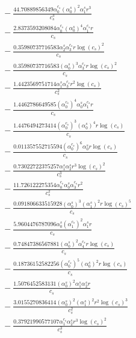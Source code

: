 \documentclass[10pt]{article}
\begin{document}
\begin{align*}
&{}  - \frac{44.70889856349 \alpha_{0}^{c_s} \left(\alpha_{0}^s\right)^{2} \alpha_{1}^s r^{3}}{c_{s}^{3}} \\
&{}  - \frac{2.8373593208084 \alpha_{0}^{c_s} \left(\alpha_{0}^s\right)^{4} \alpha_{1}^{c_s} r}{c_{s}} \\
&{}  - \frac{0.35980737716583 \alpha_{2}^s \alpha_{3}^{c_s} r \log{\left(c_{s} \right)}^{2}}{c_{s}} \\
&{}  - \frac{0.35980737716583 \left(\alpha_{0}^s\right)^{3} \alpha_{3}^{c_s} r \log{\left(c_{s} \right)}^{2}}{c_{s}} \\
&{}  - \frac{1.4423569751714 \alpha_{1}^s \alpha_{3}^{c_s} r^{2} \log{\left(c_{s} \right)}}{c_{s}^{2}} \\
&{}  - \frac{1.4462786649585 \left(\alpha_{0}^{c_s}\right)^{4} \alpha_{0}^s \alpha_{1}^{c_s} r}{c_{s}} \\
&{}  - \frac{1.4476494273414 \left(\alpha_{0}^{c_s}\right)^{3} \left(\alpha_{0}^s\right)^{4} r \log{\left(c_{s} \right)}}{c_{s}} \\
&{}  - \frac{0.011357552715594 \left(\alpha_{0}^{c_s}\right)^{6} \alpha_{0}^s r \log{\left(c_{s} \right)}}{c_{s}} \\
&{}  - \frac{0.73022722375257 \alpha_{1}^s \alpha_{2}^s r^{3} \log{\left(c_{s} \right)}^{2}}{c_{s}^{3}} \\
&{}  - \frac{11.726122275354 \alpha_{0}^{c_s} \alpha_{0}^s \alpha_{3}^{c_s} r^{2}}{c_{s}^{2}} \\
&{}  - \frac{0.091806633515928 \left(\alpha_{0}^s\right)^{3} \left(\alpha_{1}^s\right)^{2} r \log{\left(c_{s} \right)}^{5}}{c_{s}} \\
&{}  - \frac{5.9604476787096 \alpha_{0}^s \left(\alpha_{1}^{c_s}\right)^{2} \alpha_{1}^s r}{c_{s}} \\
&{}  - \frac{0.74847386567881 \left(\alpha_{0}^s\right)^{2} \alpha_{4}^{c_s} r \log{\left(c_{s} \right)}}{c_{s}} \\
&{}  - \frac{0.18736152582256 \left(\alpha_{0}^{c_s}\right)^{5} \left(\alpha_{0}^s\right)^{2} r \log{\left(c_{s} \right)}}{c_{s}} \\
&{}  - \frac{1.5076452583131 \left(\alpha_{0}^s\right)^{2} \alpha_{1}^s \alpha_{2}^s r}{c_{s}} \\
&{}  - \frac{3.0155270836414 \left(\alpha_{0}^s\right)^{2} \left(\alpha_{1}^s\right)^{2} r^{2} \log{\left(c_{s} \right)}^{3}}{c_{s}^{2}} \\
&{}  - \frac{0.37921990577107 \alpha_{1}^{c_s} \alpha_{2}^s r^{3} \log{\left(c_{s} \right)}^{2}}{c_{s}^{3}} \\

\end{align*}
\end{document}
